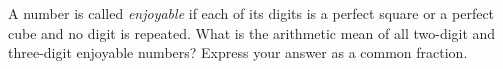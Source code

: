 A number is called \emph{enjoyable} if each of its digits is a perfect square or a perfect cube and no digit is repeated. What is the arithmetic mean of all two-digit and three-digit enjoyable numbers? Express your answer as a common fraction.
